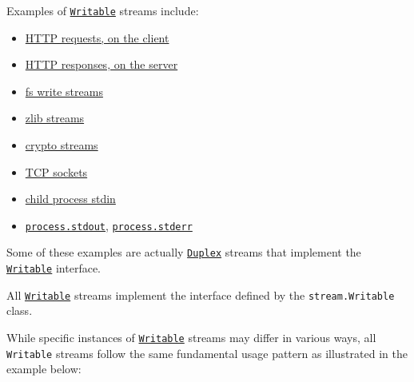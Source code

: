 Examples of \hyperref[class-streamwritable]{\texttt{Writable}} streams
include:

\begin{itemize}
\tightlist
\item
  \href{http.md\#class-httpclientrequest}{HTTP requests, on the client}
\item
  \href{http.md\#class-httpserverresponse}{HTTP responses, on the
  server}
\item
  \href{fs.md\#class-fswritestream}{fs write streams}
\item
  \href{zlib.md}{zlib streams}
\item
  \href{crypto.md}{crypto streams}
\item
  \href{net.md\#class-netsocket}{TCP sockets}
\item
  \href{child_process.md\#subprocessstdin}{child process stdin}
\item
  \href{process.md\#processstdout}{\texttt{process.stdout}},
  \href{process.md\#processstderr}{\texttt{process.stderr}}
\end{itemize}

Some of these examples are actually
\hyperref[class-streamduplex]{\texttt{Duplex}} streams that implement
the \hyperref[class-streamwritable]{\texttt{Writable}} interface.

All \hyperref[class-streamwritable]{\texttt{Writable}} streams implement
the interface defined by the \texttt{stream.Writable} class.

While specific instances of
\hyperref[class-streamwritable]{\texttt{Writable}} streams may differ in
various ways, all \texttt{Writable} streams follow the same fundamental
usage pattern as illustrated in the example below:

\begin{Shaded}
\begin{Highlighting}[]
\OperatorTok{=} \NormalTok{()}\OperatorTok{;}
\NormalTok{(}\NormalTok{)}\OperatorTok{;}
\NormalTok{(}\NormalTok{)}\OperatorTok{;}
\NormalTok{(}\NormalTok{)}\OperatorTok{;}
\end{Highlighting}
\end{Shaded}

